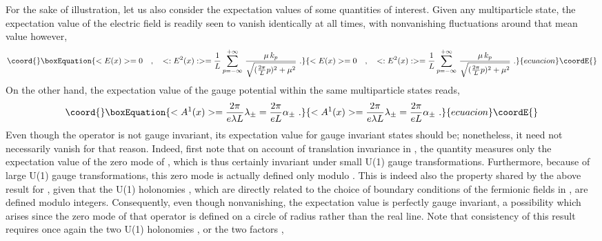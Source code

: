 \documentclass[a4paper,11pt]{article}
\begin{document}
For the sake of illustration, let us also consider the expectation values 
of some quantities of interest. Given any multiparticle state, the
expectation value of the electric field is readily seen to vanish
identically at all times, with nonvanishing fluctuations around that 
mean value however,
\begin{equation}\coord{}\boxEquation{
<E(x)>=0\ \ \ ,\ \ \
<:E^2(x):>=\frac{1}{L}\sum_{p=-\infty}^{+\infty}\,
\frac{\mu\,k_p}{\sqrt{(\frac{2\pi}{L}p)^2+\mu^2}}\ .
}{
<E(x)>=0\ \ \ ,\ \ \
<:E^2(x):>=\frac{1}{L}\sum_{p=-\infty}^{+\infty}\,
\frac{\mu\,k_p}{\sqrt{(\frac{2\pi}{L}p)^2+\mu^2}}\ .
}{ecuacion}\coordE{}\end{equation}
On the other hand, the expectation value of the gauge potential \coordHE{}
within the same multiparticle states reads,
\begin{equation}\coord{}\boxEquation{
<A^1(x)>=\frac{2\pi}{e\lambda L}\lambda_\pm=\frac{2\pi}{eL}\alpha_\pm\ .
}{
<A^1(x)>=\frac{2\pi}{e\lambda L}\lambda_\pm=\frac{2\pi}{eL}\alpha_\pm\ .
}{ecuacion}\coordE{}\end{equation}
Even though the operator \myHighlight{$A^1(x)$}\coordHE{} is not gauge invariant, its expectation
value for gauge invariant states should be; nonetheless, it need not 
necessarily vanish for that reason. Indeed, first note that on account of 
translation invariance in \myHighlight{$x$}\coordHE{}, the quantity \coordHE{} measures only the 
expectation value of the zero mode of \myHighlight{$A^1(x)$}\coordHE{}, which is thus certainly 
invariant under small U(1) gauge transformations. Furthermore, because of large
U(1) gauge transformations, this zero mode is actually defined only modulo
\myHighlight{$(2\pi)/(|e|L)$}\coordHE{}. This is indeed also the property shared by the above
result for \myHighlight{$<A^1(x)>$}\coordHE{}, given that the U(1) holonomies \myHighlight{$\lambda_\pm$}\coordHE{}, 
which are directly related to the choice of boundary conditions of the 
fermionic fields \myHighlight{$\psi_\pm(x)$}\coordHE{} in \myHighlight{$x$}\coordHE{}, are defined modulo integers. 
Consequently, even though nonvanishing, the expectation value \coordHE{}
is perfectly gauge invariant, a possibility which arises since the
zero mode of that operator is defined on a circle of radius \myHighlight{$1/(|e|L)$}\coordHE{}
rather than the real line. Note that consistency of this result requires once 
again the two U(1) holonomies \myHighlight{$\lambda_\pm$}\coordHE{}, or the two factors \myHighlight{$\alpha_\pm$}\coordHE{},
\end{document}
